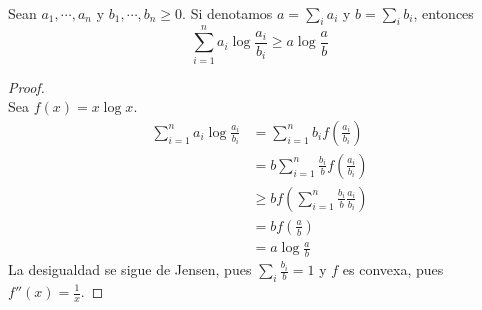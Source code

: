 \documentclass[main.tex]{subfiles}
\begin{document}
\begin{lemma} \ \\
	Sean $a_1, \cdots, a_n$ y $b_1, \cdots, b_n \geq 0$. Si denotamos $a=\sum_ia_i$ y $b=\sum_ib_i$, entonces
	\begin{equation*}
	\sum_{i=1}^na_i\log\frac{a_i}{b_i} \geq a\log\frac{a}{b}	
	\end{equation*}
\end{lemma}
\begin{proof} \ \\
Sea $f(x)=x \log x$. 	
\begin{align*}
\sum_{i=1}^na_i\log\frac{a_i}{b_i} &= 
	\sum_{i=1}^nb_if\left(\frac{a_i}{b_i}\right) \\
	&= b\sum_{i=1}^n\frac{b_i}{b}f\left(\frac{a_i}{b_i}\right) \\
	&\geq bf\left(\sum_{i=1}^n\frac{b_i}{b}\frac{a_i}{b_i}\right)\\
	&= bf\left(\frac{a}{b}\right) \\
	&= a\log\frac{a}{b}
\end{align*}
La desigualdad se sigue de Jensen, pues $\sum_i\frac{b_i}{b}=1$ y $f$ es convexa, pues $f''(x)=\frac{1}{x}$.
\end{proof}
\end{document}
